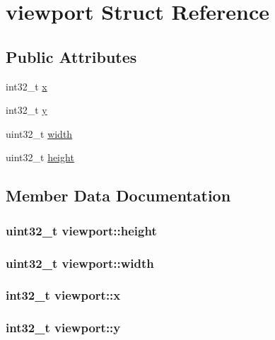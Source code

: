 \hypertarget{structviewport}{\section{viewport Struct Reference}
\label{structviewport}
}
\subsection*{Public Attributes}
\begin{DoxyCompactItemize}
\item 
int32\-\_\-t \hyperlink{structviewport_af15859b95160fdbce837547c585f2aec}{x}
\item 
int32\-\_\-t \hyperlink{structviewport_a9ffe59cc8a2c8fe2a101362a0465897e}{y}
\item 
uint32\-\_\-t \hyperlink{structviewport_a136ab41404efc11ad2654b0de7378886}{width}
\item 
uint32\-\_\-t \hyperlink{structviewport_a9a2d0b0eb58b9da4e40b435383406b65}{height}
\end{DoxyCompactItemize}


\subsection{Member Data Documentation}
\hypertarget{structviewport_a9a2d0b0eb58b9da4e40b435383406b65}{
\subsubsection[{height}]{\setlength{\rightskip}{0pt plus 5cm}uint32\-\_\-t viewport\-::height}}\label{structviewport_a9a2d0b0eb58b9da4e40b435383406b65}
\hypertarget{structviewport_a136ab41404efc11ad2654b0de7378886}{
\subsubsection[{width}]{\setlength{\rightskip}{0pt plus 5cm}uint32\-\_\-t viewport\-::width}}\label{structviewport_a136ab41404efc11ad2654b0de7378886}
\hypertarget{structviewport_af15859b95160fdbce837547c585f2aec}{
\subsubsection[{x}]{\setlength{\rightskip}{0pt plus 5cm}int32\-\_\-t viewport\-::x}}\label{structviewport_af15859b95160fdbce837547c585f2aec}
\hypertarget{structviewport_a9ffe59cc8a2c8fe2a101362a0465897e}{
\subsubsection[{y}]{\setlength{\rightskip}{0pt plus 5cm}int32\-\_\-t viewport\-::y}}\label{structviewport_a9ffe59cc8a2c8fe2a101362a0465897e}


